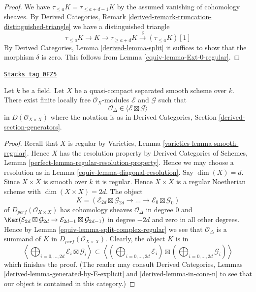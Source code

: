 \begin{proof}

We have $\tau_{\leq a}K = \tau_{\leq a + d - 1}K$ by the assumed
vanishing of cohomology sheaves. By Derived Categories, Remark
\ref{derived-remark-truncation-distinguished-triangle}
we have a distinguished triangle
$$
\tau_{\leq a}K \to K \to \tau_{\geq a + d}K \xrightarrow{\delta}
(\tau_{\leq a}K)[1]
$$
By Derived Categories, Lemma \ref{derived-lemma-split} it
suffices to show that the morphism $\delta$ is zero.
This follows from Lemma \ref{equiv-lemma-Ext-0-regular}.
\end{proof}

\begin{lemma}
\label{equiv-lemma-diagonal-trick}
\href{https://stacks.math.columbia.edu/tag/0FZ5}{\texttt{Stacks tag 0FZ5}}

Let $k$ be a field. Let $X$ be a quasi-compact separated smooth scheme over $k$.
There exist finite locally free $\mathcal{O}_X$-modules
$\mathcal{E}$ and $\mathcal{G}$ such that
$$
\mathcal{O}_\Delta \in \langle \mathcal{E} \boxtimes \mathcal{G} \rangle
$$
in $D(\mathcal{O}_{X \times X})$ where the notation is as in
Derived Categories, Section \ref{derived-section-generators}.
\end{lemma}

\begin{proof}

Recall that $X$ is regular by
Varieties, Lemma \ref{varieties-lemma-smooth-regular}.
Hence $X$ has the resolution property by
Derived Categories of Schemes, Lemma
\ref{perfect-lemma-regular-resolution-property}.
Hence we may choose a resolution as in Lemma \ref{equiv-lemma-diagonal-resolution}.
Say $\dim(X) = d$. Since $X \times X$ is smooth over $k$ it is regular.
Hence $X \times X$ is a regular Noetherian scheme with
$\dim(X \times X) = 2d$. The object
$$
K = (\mathcal{E}_{2d} \boxtimes \mathcal{G}_{2d} \to
\ldots \to
\mathcal{E}_0 \boxtimes \mathcal{G}_0)
$$
of $D_{perf}(\mathcal{O}_{X \times X})$
has cohomology sheaves $\mathcal{O}_\Delta$
in degree $0$ and $\Ker(\mathcal{E}_{2d} \boxtimes \mathcal{G}_{2d} \to
\mathcal{E}_{2d-1} \boxtimes \mathcal{G}_{2d-1})$ in degree $-2d$ and zero
in all other degrees.
Hence by Lemma \ref{equiv-lemma-split-complex-regular} we see that
$\mathcal{O}_\Delta$ is a summand of $K$ in
$D_{perf}(\mathcal{O}_{X \times X})$.
Clearly, the object $K$ is in
$$
\left\langle
\bigoplus\nolimits_{i = 0, \ldots, 2d} \mathcal{E}_i \boxtimes \mathcal{G}_i
\right\rangle
\subset
\left\langle
\left(\bigoplus\nolimits_{i = 0, \ldots, 2d} \mathcal{E}_i\right)
\boxtimes
\left(\bigoplus\nolimits_{i = 0, \ldots, 2d} \mathcal{G}_i\right)
\right\rangle
$$
which finishes the proof. (The reader may consult
Derived Categories, Lemmas \ref{derived-lemma-generated-by-E-explicit} and
\ref{derived-lemma-in-cone-n} to see that our object is contained in this
category.)
\end{proof}

